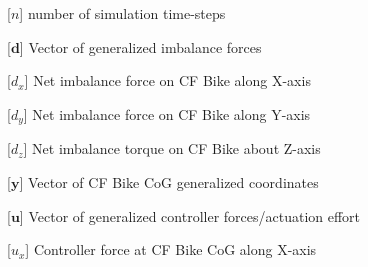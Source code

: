 
\newcommand{\acrounit}[1]{
\acroextra{\makebox[18mm][l]{\si{#1}}}
}

\chapter*{}



\section*{}
\begin{acronym}[LONGEST]
	[\ensuremath{n}]{\acrounit{-}number of simulation time-steps}
\end{acronym}
\begin{acronym}[LONGEST]
	[\ensuremath{\mathbf{d}}]{\acrounit{-}Vector of generalized imbalance forces}
\end{acronym}
\begin{acronym}[LONGEST]
	[\ensuremath{d_x}]{\acrounit{\N}Net imbalance force on CF Bike along X-axis}
\end{acronym}
\begin{acronym}[LONGEST]
	[\ensuremath{d_y}]{\acrounit{\N}Net imbalance force on CF Bike along Y-axis}
\end{acronym}
\begin{acronym}[LONGEST]
	[\ensuremath{d_z}]{\acrounit{\N-m}Net imbalance torque on CF Bike about Z-axis}
\end{acronym}
\begin{acronym}[LONGEST]
	[\ensuremath{\mathbf{y}}]{\acrounit{-}Vector of CF Bike CoG generalized coordinates}
\end{acronym}
\begin{acronym}[LONGEST]
	[\ensuremath{\mathbf{u}}]{\acrounit{-}Vector of generalized controller forces/actuation effort}
\end{acronym}
\begin{acronym}[LONGEST]
	[\ensuremath{u_x}]{\acrounit{\N}Controller force at CF Bike CoG along X-axis}
\end{acronym}
